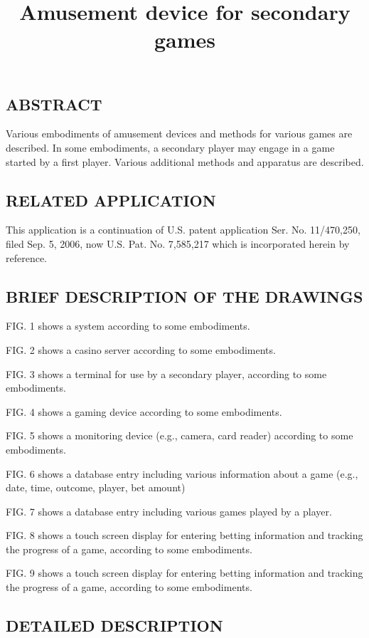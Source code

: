 \documentclass[11pt,a4paper]{article}
\title{Amusement device for secondary games}
\begin{document}
\maketitle

\subsection{ABSTRACT}

Various embodiments of amusement devices and methods for various games are described. In some embodiments, a secondary player may engage in a game started by a first player. Various additional methods and apparatus are described.

\subsection{RELATED APPLICATION}

This application is a continuation of U.S. patent application Ser. No. 11/470,250, filed Sep. 5, 2006, now U.S. Pat. No. 7,585,217 which is incorporated herein by reference.

\subsection{BRIEF DESCRIPTION OF THE DRAWINGS}

FIG. 1 shows a system according to some embodiments.

FIG. 2 shows a casino server according to some embodiments.

FIG. 3 shows a terminal for use by a secondary player, according to some embodiments.

FIG. 4 shows a gaming device according to some embodiments.

FIG. 5 shows a monitoring device (e.g., camera, card reader) according to some embodiments.

FIG. 6 shows a database entry including various information about a game (e.g., date, time, outcome, player, bet amount)

FIG. 7 shows a database entry including various games played by a player.

FIG. 8 shows a touch screen display for entering betting information and tracking the progress of a game, according to some embodiments.

FIG. 9 shows a touch screen display for entering betting information and tracking the progress of a game, according to some embodiments.

\subsection{DETAILED DESCRIPTION}
\end{document}

